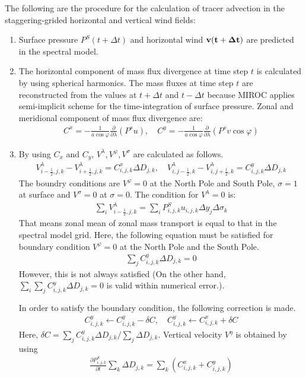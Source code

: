 The following are the procedure for the calculation of tracer advection in the staggering-grided horizontal and vertical wind fields:

\begin{enumerate}
\def\labelenumi{\arabic{enumi}.}
\item
  Surface pressure \(P^{S}(t+\Delta t)\) and horizontal wind \(\bf{v}(t+\Delta t)\) are predicted in the spectral model.
\item
  The horizontal component of mass flux divergence at time step \(t\) is calculated by using spherical harmonics. The mass fluxes at time step \(t\) are reconstructed from the values at \(t+\Delta t\)
  and \(t-\Delta t\) because MIROC applies semi-implicit scheme for the time-integration of surface pressure. Zonal and meridional component of mass flux divergence are:
  \begin{eqnarray}C^{x}=-\frac{1}{a \cos \varphi}\frac{\partial}{\partial \lambda}(P^{s}u),\quad C^{y}=-\frac{1}{a \cos \varphi}\frac{\partial}{\partial \lambda}(P^{s}v \cos \varphi)\end{eqnarray}
\item
  By using \(C_{x}\) and \(C_{y}\), \(V^{\lambda}, V^{\varphi}, V^{\sigma}\) are calculated as follows.
  \begin{eqnarray}V^{\lambda}_{i-\frac{1}{2},j,k}-V^{\lambda}_{i+\frac{1}{2},j,k}=C^{x}_{i,j,k}\Delta D_{j,k}, \quad V^{\lambda}_{i,j-\frac{1}{2},k}-V^{\lambda}_{i,j+\frac{1}{2},k}=C^{y}_{i,j,k}\Delta D_{j,k}\end{eqnarray} The
  boundry conditions are \(V^{\varphi}=0\) at the North Pole and South Pole, \(\sigma=1\) at surface and \(V^{\sigma}=0\) at \(\sigma=0\). The condition for \(V^{\lambda}=0\) is:
  \begin{eqnarray}\sum_{i}V^{\lambda}_{i-\frac{1}{2},j,k}=\sum_{i}P^{S}_{i,j,k}u_{i,j,k}\Delta y_{j}\Delta \sigma_{k}\end{eqnarray} That means zonal mean of zonal mass transport is equal to that in the spectral model grid.
  Here, the following equation must be satisfied for boundary condition \(V^{\varphi}=0\) at the North Pole and the South Pole. \begin{eqnarray}\sum_{j}C^{y}_{i,j,k}\Delta D_{j,k}=0\end{eqnarray} However, this is not always
  satisfied (On the other hand, \(\sum_{i} \sum_{j}C^{y}_{i,j,k}\Delta D_{j,k}=0\) is valid within numerical error.).

  In order to satisfy the boundary condition, the following correction is made. \begin{eqnarray}C^{y}_{i,j,k}\leftarrow C^{y}_{i,j,k}-\delta C, \quad C^{y}_{i,j,k}\leftarrow C^{x}_{i,j,k}+\delta C\end{eqnarray} Here,
  \(\delta C=\sum_{j}C^{y}_{i,j,k}\Delta D_{j,k}/\sum_{j}\Delta D_{j,k}\). Vertical velocity \(V^{\eta}\) is obtained by using \begin{eqnarray}
  \label{a2}
  \frac{\partial P^{S}_{i,j,k}}{\partial t}\sum_{k}\Delta D_{j,k}=\sum_{k}(C^{x}_{i,j,k}+C^{y}_{i,j,k})
  \end{eqnarray}


\end{enumerate}
